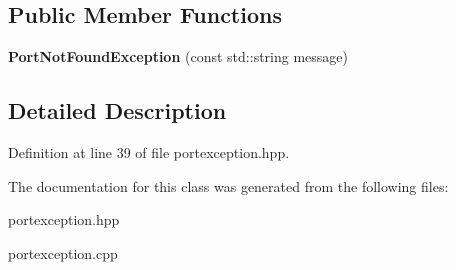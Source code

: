 \subsection*{Public Member Functions}
\begin{DoxyCompactItemize}
\item 
\hypertarget{class_port_not_found_exception_a2b233cfee5fc9eb16817e405107f95cd}{}\label{class_port_not_found_exception_a2b233cfee5fc9eb16817e405107f95cd} 
{\bfseries Port\+Not\+Found\+Exception} (const std\+::string message)
\end{DoxyCompactItemize}


\subsection{Detailed Description}


Definition at line 39 of file portexception.\+hpp.



The documentation for this class was generated from the following files\+:\begin{DoxyCompactItemize}
\item 
portexception.\+hpp\item 
portexception.\+cpp\end{DoxyCompactItemize}
